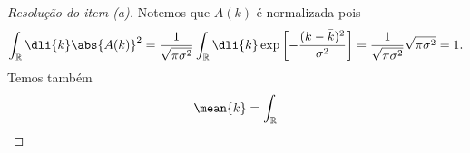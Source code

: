 \begin{proof}[Resolução do item (a)]
    Notemos que \(A(k)\) é normalizada pois
    \begin{equation*}
        \int_{\mathbb{R}} \dli{k} \abs{A(k)}^2 = \frac{1}{\sqrt{\pi \sigma^2}} \int_{\mathbb{R}}\dli{k}\exp\left[-\frac{(k - \bar{k})^2}{\sigma^2}\right] = \frac{1}{\sqrt{\pi \sigma^2}} \sqrt{\pi \sigma^2} = 1.
    \end{equation*}
    Temos também
    \begin{equation*}
        \mean{k} = \int_{\mathbb{R}}
    \end{equation*}
\end{proof}
